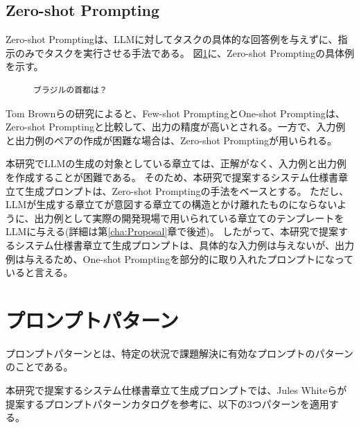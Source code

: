 \subsection{Zero-shot Prompting}
\label{subsec:zero_shot}

Zero-shot Prompting\cite{zeroshot}は、LLMに対してタスクの具体的な回答例を与えずに、指示のみでタスクを実行させる手法である。
図\ref{fig:zero}に、Zero-shot Promptingの具体例を示す。


\begin{figure}[tp]
\begin{tcolorbox}[
  colback=white,
  colframe=blue,
  fonttitle=\bfseries,
]
\footnotesize
\ttfamily
\fontsize{10}{11}\selectfont
\begin{verbatim}
ブラジルの首都は？
\end{verbatim}
\end{tcolorbox}
\label{fig:zero}
\end{figure}



Tom Brownらの研究によると、Few-shot PromptingとOne-shot Promptingは、Zero-shot Promptingと比較して、出力の精度が高いとされる\cite{zeroonefew}。一方で、入力例と出力例のペアの作成が困難な場合は、Zero-shot Promptingが用いられる。

本研究でLLMの生成の対象としている章立ては、正解がなく、入力例と出力例を作成することが困難である。
そのため、本研究で提案するシステム仕様書章立て生成プロンプトは、Zero-shot Promptingの手法をベースとする。
ただし、LLMが生成する章立てが意図する章立ての構造とかけ離れたものにならないように、出力例として実際の開発現場で用いられている章立てのテンプレートをLLMに与える(詳細は第\ref{cha:Proposal}章で後述)。
したがって、本研究で提案するシステム仕様書章立て生成プロンプトは、具体的な入力例は与えないが、出力例は与えるため、One-shot Promptingを部分的に取り入れたプロンプトになっていると言える。

\section{プロンプトパターン}
\label{sec:prompt_patterns}

プロンプトパターンとは、特定の状況で課題解決に有効なプロンプトのパターンのことである\cite{nishino}。

本研究で提案するシステム仕様書章立て生成プロンプトでは、Jules Whiteらが提案するプロンプトパターンカタログ\cite{prompt-patterns}を参考に、以下の3つパターンを適用する。

